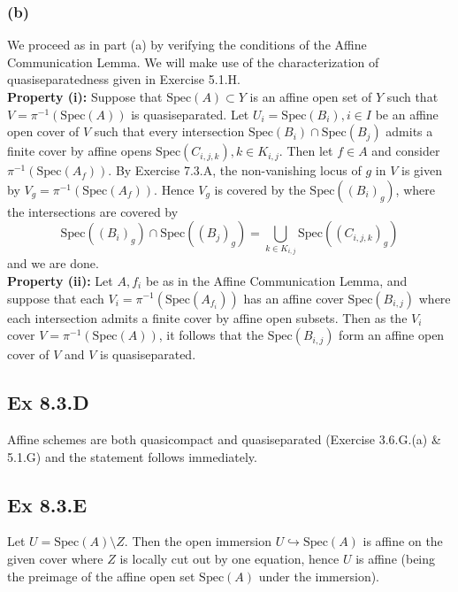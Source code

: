 \documentclass{article}
\theoremstyle{definition}
\newcommand{\Spec}{\text{Spec}}
\begin{document}
	\subsubsection*{(b)}

	We proceed as in part (a) by verifying the conditions of the Affine
	Communication Lemma. We will make use of the characterization of
	quasiseparatedness given in Exercise 5.1.H. \\

	\textbf{Property (i): } Suppose that $\Spec(A) \subset Y$ is an affine open set
	of $Y$ such that $V = \pi^{-1}(\Spec(A))$ is quasiseparated. Let $U_i =
\Spec(B_i), i \in I$ be an affine open cover of $V$ such that every
	intersection $\Spec(B_i) \cap \Spec(B_j)$ admits a finite cover by affine opens
$\Spec(C_{i, j, k}), k \in K_{i, j}$. Then let $f \in A$ and consider
$\pi^{-1}(\Spec(A_f))$. By Exercise 7.3.A, the non-vanishing locus of $g$ in
$V$ is given by $V_g = \pi^{-1}(\Spec(A_f))$. Hence $V_g$ is covered by the
$\Spec((B_i)_g)$, where the intersections are covered by
	\[
		\Spec((B_i)_g)
		\cap
		\Spec((B_j)_g)
		=
		\bigcup_{k \in K_{i, j}}
		\Spec((C_{i, j, k})_g)
	\]
	and we are done. \\

	\textbf{Property (ii): } Let $A, f_i$ be as in the Affine Communication Lemma,
	and suppose that each $V_i = \pi^{-1}(\Spec(A_{f_i}))$ has an affine cover
$\Spec(B_{i, j})$ where each intersection admits a finite cover by affine open
	subsets. Then as the $V_i$ cover $V = \pi^{-1}(\Spec(A))$, it follows that the
$\Spec(B_{i, j})$ form an affine open cover of $V$ and $V$ is quasiseparated.


\subsection*{Ex 8.3.D}

Affine schemes are both quasicompact and quasiseparated (Exercise 3.6.G.(a) \&
5.1.G) and the statement follows immediately.

\subsection*{Ex 8.3.E}

Let $U = \Spec(A) \setminus Z$. Then the open immersion $U \hookrightarrow
\Spec(A)$ is affine on the given cover where $Z$ is locally cut out by one
equation, hence $U$ is affine (being the preimage of the affine open set
$\Spec(A)$ under the immersion).
\end{document}
